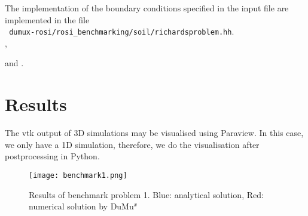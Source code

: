 %	

%	

The implementation of the boundary conditions specified in the input file are implemented in the file\\ 
\verb+ dumux-rosi/rosi_benchmarking/soil/richardsproblem.hh+.\\
,
%
	
and
.		
											

\section*{Results}
The vtk output of 3D simulations may be visualised using Paraview. In this case, we only have a 1D simulation, therefore, we do the visualisation after postprocessing in Python. 

\begin{figure}[ht]
	\centering
  \texttt{[image: benchmark1.png]}
	\captionsetup{labelformat=empty}
	\caption{Results of benchmark problem 1. Blue: analytical solution, Red: numerical solution by DuMu$^x$}
\end{figure}

